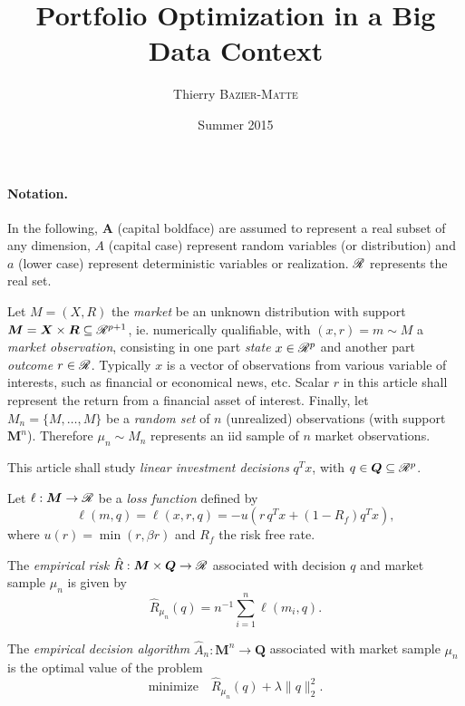 \documentclass[11pt]{article}
\title{Portfolio Optimization in a Big Data Context}
\author{Thierry \textsc{Bazier-Matte}}
\date{Summer 2015}
\begin{document}
\maketitle

\paragraph{Notation.}
In the following, $\bm A$ (capital boldface) are assumed to represent a real subset of any
dimension, $A$ (capital case) represent random variables (or distribution) and $a$ (lower
case) represent deterministic variables or realization. $\mathscr{R}$ represents the real set.

Let $M=(X,R)$ the \textsl{market} be an unknown distribution with support
$\bm M = \bm X\times \bm R \subseteq\mathscr{R}^{p+1}$, ie. numerically qualifiable, with
$(x,r) = m\sim M$ a \textsl{market observation}, consisting in one part \textsl{state}
$x\in\mathscr{R}^p$ and another part \textsl{outcome} $r\in\mathscr{R}$. Typically $x$ is a vector of
observations from various variable of interests, such as financial or economical news,
etc. Scalar $r$ in this article shall represent the return from a financial asset of
interest. Finally, let $M_n = \{M,\dots,M\}$ be a \textsl{random set} of $n$ (unrealized)
observations (with support $\bm M^n$). Therefore $\mu_n \sim M_n$ represents an iid sample
of $n$ market observations.

This article shall study \textsl{linear investment decisions} $q^Tx$, with
$q\in \bm Q\subseteq\mathscr{R}^p$.

\begin{deff}
  Let $\ell:\bm M\to\mathscr{R}$ be a \textsl{loss function} defined by
  \begin{equation*}
    \ell(m,q) = \ell(x,r,q) = -u(r\,q^{T}x + (1-R_f)q^{T}x),
  \end{equation*}
  where $u(r) = \min(r,\beta r)$ and $R_f$ the risk free rate. 
\end{deff}

\begin{deff}
  The \textsl{empirical risk} $\hat R: \bm M\times \bm Q \to \mathscr{R}$ associated with decision
  $q$ and market sample $\mu_n$ is given by
 \begin{equation*}
   \hat R_{\mu_n}(q) = n^{-1} \sum_{i=1}^n \ell(m_i,q).
 \end{equation*}
\end{deff}

\begin{deff}
  The \textsl{empirical decision algorithm} $\hat A_n:\bm M^n \to \bm Q$ associated with
  market sample $\mu_n$ is the optimal value of the problem
  \begin{equation*}
    \text{minimize}\quad\hat R_{\mu_n}(q) + \lambda\|q\|_2^2.
  \end{equation*}
\end{deff}
\end{document}
